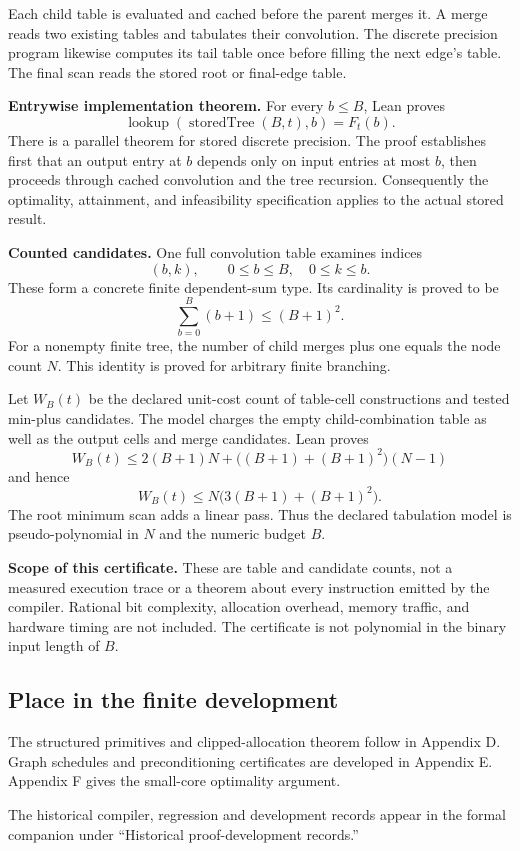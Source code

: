 Each child table is evaluated and cached before the parent merges it. A merge reads two existing tables and tabulates their convolution. The discrete precision program likewise computes its tail table once before filling the next edge's table. The final scan reads the stored root or final-edge table.

\textbf{Entrywise implementation theorem.} For every $b\leq B$, Lean proves
\[
\operatorname{lookup}(\operatorname{storedTree}(B,t),b)=F_t(b).
\]
There is a parallel theorem for stored discrete precision. The proof establishes first that an output entry at $b$ depends only on input entries at most $b$, then proceeds through cached convolution and the tree recursion. Consequently the optimality, attainment, and infeasibility specification applies to the actual stored result.

\textbf{Counted candidates.} One full convolution table examines indices
\[
(b,k),\qquad 0\leq b\leq B,\quad0\leq k\leq b.
\]
These form a concrete finite dependent-sum type. Its cardinality is proved to be
\[
\sum_{b=0}^B(b+1)\leq(B+1)^2.
\]
For a nonempty finite tree, the number of child merges plus one equals the node count $N$. This identity is proved for arbitrary finite branching.

Let $W_B(t)$ be the declared unit-cost count of table-cell constructions and tested min-plus candidates. The model charges the empty child-combination table as well as the output cells and merge candidates. Lean proves
\[
W_B(t)\leq2(B+1)N+\bigl((B+1)+(B+1)^2\bigr)(N-1)
\]
and hence
\[
\boxed{W_B(t)\leq N\bigl(3(B+1)+(B+1)^2\bigr).}
\]
The root minimum scan adds a linear pass. Thus the declared tabulation model is pseudo-polynomial in $N$ and the numeric budget $B$.

\textbf{Scope of this certificate.} These are table and candidate counts, not a measured execution trace or a theorem about every instruction emitted by the compiler. Rational bit complexity, allocation overhead, memory traffic, and hardware timing are not included. The certificate is not polynomial in the binary input length of $B$.



\subsection{Place in the finite development}\label{supp3:subsection:007}
The structured primitives and clipped-allocation theorem follow in Appendix D. Graph schedules and preconditioning certificates are developed in Appendix E. Appendix F gives the small-core optimality argument.

The historical compiler, regression and development records appear in the formal companion under ``Historical proof-development records.''
